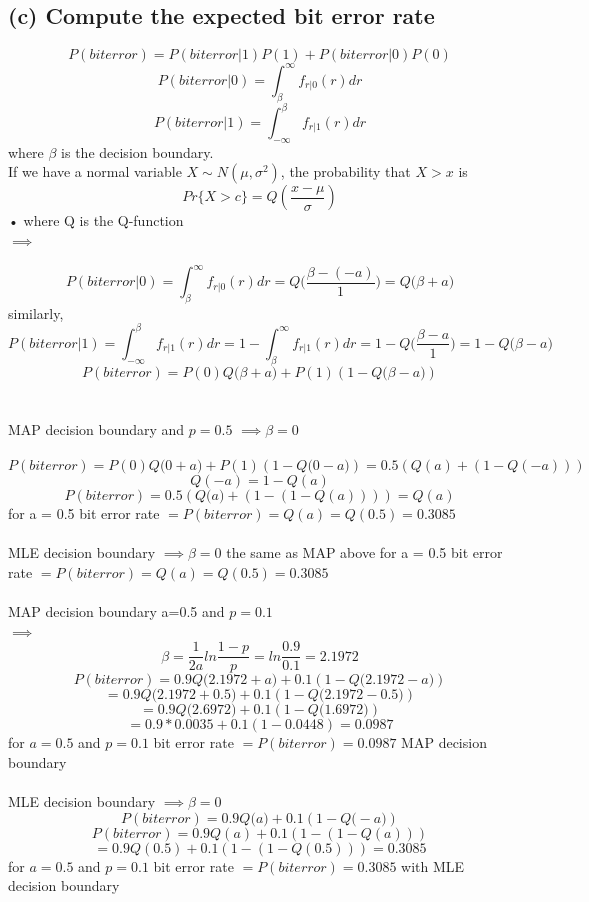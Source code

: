 \documentclass[a4paper,11pt]{article}
\begin{document}
\subsection*{(c) Compute the expected bit error rate}
$$P(biterror) = P(biterror|1)P(1)+P(biterror|0)P(0)$$
$$P(biterror|0) = \int_{\beta}^{\infty}f_{r|0}(r) dr$$
$$P(biterror|1) = \int_{-\infty}^{\beta}f_{r|1}(r) dr$$
where $\beta$ is the decision boundary.\\
If we have a normal variable $X\sim N(\mu,\sigma^2)$, the probability that $X>x$ is\\
\begin{equation}
Pr\{X>c\} = Q(\frac{x-\mu}{\sigma})
\end{equation}•
where Q is the Q-function\\
$\implies$

$$P(biterror|0) = \int_{\beta}^{\infty}f_{r|0}(r) dr = Q\bigg(\frac{\beta-(-a)}{1}\bigg)= Q\big(\beta+a\big)$$
similarly,
$$P(biterror|1) = \int_{-\infty}^{\beta}f_{r|1}(r) dr=1-\int_{\beta}^{\infty}f_{r|1}(r) dr=1-Q\bigg(\frac{\beta-a}{1}\bigg)=1-Q\big(\beta-a\big)$$
$$P(biterror) = P(0)Q\big(\beta+a\big)+P(1)(1-Q\big(\beta-a\big))$$\\\\
 MAP decision boundary and $p=0.5$ $\implies \beta = 0$  \\\\
 $$P(biterror) = P(0)Q\big(0+a\big)+P(1)(1-Q\big(0-a\big)) =0.5(Q(a)+(1-Q(-a)))  $$
 $$Q(-a) = 1 - Q(a)$$
 $$P(biterror) =0.5(Q\big(a\big)+(1-(1-Q(a)))) =Q(a) $$
 for a = 0.5 bit error rate  $= P(biterror) =Q(a) = Q(0.5) = 0.3085$\\\\
 MLE decision boundary  $\implies \beta = 0$  the same as MAP above for a = 0.5 bit error rate  $= P(biterror) =Q(a) = Q(0.5) = 0.3085$\\\\
 MAP decision boundary a=0.5 and $p=0.1$\\ $\implies$\\
 $$\beta =\frac{1}{2a} ln\frac{1-p}{p}=ln\frac{0.9}{0.1}=2.1972$$
 $$P(biterror) = 0.9Q\big(2.1972+a\big)+0.1(1-Q\big(2.1972-a\big))
 $$
 $$= 0.9Q\big(2.1972+0.5\big)+0.1(1-Q\big(2.1972-0.5\big)) $$
 $$= 0.9Q\big(2.6972\big)+0.1(1-Q\big(1.6972\big)) $$
 $$= 0.9*0.0035+0.1(1-0.0448)=0.0987 $$
 for $a = 0.5$ and $p=0.1$  bit error rate  $= P(biterror) = 0.0987$  MAP decision boundary\\\\
 MLE decision boundary $\implies \beta =0$ \\
 $$P(biterror) = 0.9Q\big(a\big)+0.1(1-Q\big(-a\big))$$
 $$P(biterror) = 0.9Q(a)+0.1(1-(1-Q(a)))$$
 $$=0.9Q(0.5)+0.1(1-(1-Q(0.5))) = 0.3085$$
 for $a = 0.5$ and $p=0.1$  bit error rate  $= P(biterror) =  0.3085$ with MLE decision boundary\\\\
\end{document}
